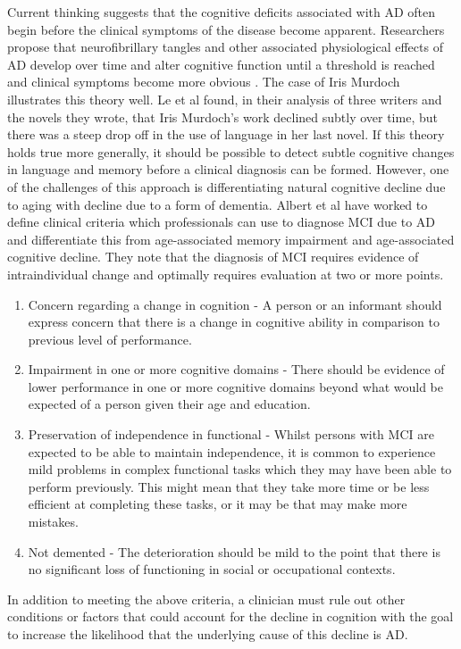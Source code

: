 \documentclass{article}
\begin{document}
\par
Current thinking suggests that the cognitive deficits associated with AD often begin before the clinical symptoms of the disease become apparent. Researchers propose that neurofibrillary tangles and other associated physiological effects of AD develop over time and alter cognitive function until a threshold is reached and clinical symptoms become more obvious \cite{Nestor2006}. The case of Iris Murdoch illustrates this theory well. Le et al \cite{Le2012}found, in their analysis of three writers and the novels they wrote, that Iris Murdoch's work declined subtly over time, but there was a steep drop off in the use of language in her last novel. If this theory holds true more generally, it should be possible to detect subtle cognitive changes in language and memory before a clinical diagnosis can be formed. However, one of the challenges of this approach is differentiating natural cognitive decline due to aging with decline due to a form of dementia. Albert et al have worked to define clinical criteria which professionals can use to diagnose MCI due to AD and differentiate this from age-associated memory impairment and age-associated cognitive decline. They note that the diagnosis of MCI requires evidence of intraindividual change and optimally requires evaluation at two or more points.
\begin{enumerate}
	\item Concern regarding a change in cognition - A person or an informant should express concern that there is a change in cognitive ability in comparison to previous level of performance.
	\item Impairment in one or more cognitive domains - There should be evidence of lower performance in one or more cognitive domains beyond what would be expected of a person given their age and education. 
	\item Preservation of independence in functional - Whilst persons with MCI are expected to be able to maintain independence, it is common to experience mild problems in complex functional tasks which they may have been able to perform previously. This might mean that they take more time or be less efficient at completing these tasks, or it may be that may make more mistakes.
	\item Not demented - The deterioration should be mild to the point that there is no significant loss of functioning in social or occupational contexts.
\end{enumerate}
In addition to meeting the above criteria, a clinician must rule out other conditions or factors that could account for the decline in cognition with the goal to increase the likelihood that the underlying cause of this decline is AD. 
\end{document}
